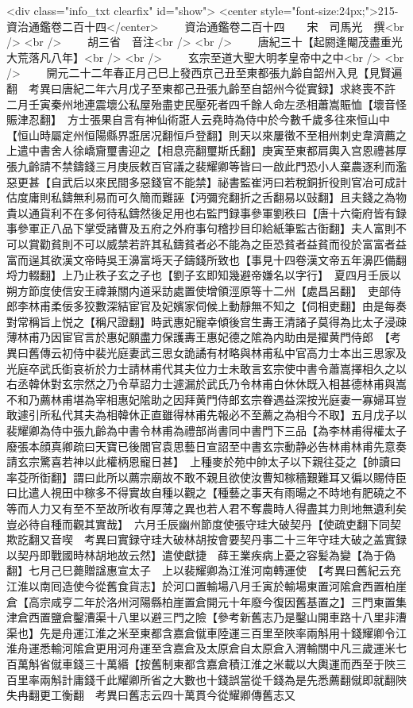 <div class="info_txt clearfix" id="show">
<center style="font-size:24px;">215-資治通鑑卷二百十四</center>
  　　資治通鑑卷二百十四　　宋　司馬光　撰<br />
<br />
　　胡三省　音注<br />
<br />
　　唐紀三十【起閼逢閹茂盡重光大荒落凡八年】<br />
<br />
　　玄宗至道大聖大明孝皇帝中之中<br />
<br />
　　開元二十二年春正月己巳上發西京己丑至東都張九齡自韶州入見【見賢遍翻　考異曰唐紀二年六月戊子至東都己丑張九齡至自韶州今從實録】求終喪不許　二月壬寅秦州地連震壞公私屋殆盡吏民壓死者四千餘人命左丞相蕭嵩賑恤【壞音怪賑津忍翻】　方士張果自言有神仙術誑人云堯時為侍中於今數千歲多往來恒山中【恒山時屬定州恒陽縣界誑居况翻恒戶登翻】則天以來屢徵不至相州刺史韋濟薦之上遣中書舍人徐嶠齎璽書迎之【相息亮翻璽斯氏翻】庚寅至東都肩輿入宫恩禮甚厚　張九齡請不禁鑄錢三月庚辰敕百官議之裴耀卿等皆曰一啟此門恐小人棄農逐利而濫惡更甚【自武后以來民間多惡錢官不能禁】祕書監崔沔曰若稅銅折役則官冶可成計估度庸則私鑄無利易而可久簡而難誣【沔彌兖翻折之舌翻易以䜴翻】且夫錢之為物貴以通貨利不在多何待私鑄然後足用也右監門録事參軍劉秩曰【唐十六衛府皆有録事參軍正八品下掌受諸曹及五府之外府事句稽抄目印給紙筆監古衘翻】夫人富則不可以賞勸貧則不可以威禁若許其私鑄貧者必不能為之臣恐貧者益貧而役於富富者益富而逞其欲漢文帝時吳王濞富埓天子鑄錢所致也【事見十四卷漢文帝五年濞匹備翻埒力輟翻】上乃止秩子玄之子也【劉子玄即知幾避帝嫌名以字行】　夏四月壬辰以朔方節度使信安王禕兼關内道采訪處置使增領涇原等十二州【處昌呂翻】　吏部侍郎李林甫柔佞多狡數深結宦官及妃嬪家伺候上動靜無不知之【伺相吏翻】由是每奏對常稱旨上悦之【稱尺證翻】時武惠妃寵幸傾後宫生夀王清諸子莫得為比太子浸疎薄林甫乃因宦官言於惠妃願盡力保護夀王惠妃德之隂為内助由是擢黄門侍郎　【考異曰舊傳云初侍中裴光庭妻武三思女詭譎有材略與林甫私中官高力士本出三思家及光庭卒武氏衘哀祈於力士請林甫代其夫位力士未敢言玄宗使中書令蕭嵩擇相久之以右丞韓休對玄宗然之乃令草詔力士遽漏於武氏乃令林甫白休休既入相甚德林甫與嵩不和乃薦林甫堪為宰相惠妃隂助之因拜黄門侍郎玄宗眷遇益深按光庭妻一寡婦耳豈敢遽引所私代其夫為相韓休正直雖得林甫先報必不至薦之為相今不取】五月戊子以裴耀卿為侍中張九齡為中書令林甫為禮部尚書同中書門下三品【為李林甫得權太子廢張本顔真卿疏曰天寶已後閻官袁思藝日宣詔至中書玄宗動静必告林甫林甫先意奏請玄宗驚喜若神以此權柄恩寵日甚】　上種麥於苑中帥太子以下親往芟之【帥讀曰率芟所衘翻】謂曰此所以薦宗廟故不敢不親且欲使汝曹知稼穡艱難耳又徧以賜侍臣曰比遣人視田中稼多不得實故自種以觀之【種藝之事天有雨暘之不時地有肥磽之不等而人力又有至不至故所收有厚薄之異也若人君不奪農時人得盡其力則地無遺利矣豈必待自種而觀其實哉】　六月壬辰幽州節度使張守珪大破契丹【使疏吏翻下同契欺訖翻又音喫　考異曰實録守珪大破林胡按會要契丹事二十三年守珪大破之盖實録以契丹即戰國時林胡地故云然】遣使獻捷　薛王業疾病上憂之容髪為變【為于偽翻】七月己巳薨贈諡惠宣太子　上以裴耀卿為江淮河南轉運使　【考異曰舊紀云充江淮以南囘造使今從舊食貨志】於河口置輸場八月壬寅於輸場東置河隂倉西置柏崖倉【高宗咸亨二年於洛州河陽縣柏崖置倉開元十年廢今復因舊基置之】三門東置集津倉西置鹽倉鑿漕渠十八里以避三門之險【參考新舊志乃是鑿山開車路十八里非漕渠也】先是舟運江淮之米至東都含嘉倉僦車陸運三百里至陜率兩斛用十錢耀卿令江淮舟運悉輸河隂倉更用河舟運至含嘉倉及太原倉自太原倉入渭輸關中凡三歲運米七百萬斛省僦車錢三十萬緡【按舊制東都含嘉倉積江淮之米載以大輿運而西至于陜三百里率兩斛計庸錢千此耀卿所省之大數也十錢誤當從千錢為是先悉薦翻僦即就翻陜失冉翻更工衡翻　考異曰舊志云四十萬貫今從耀卿傳舊志又